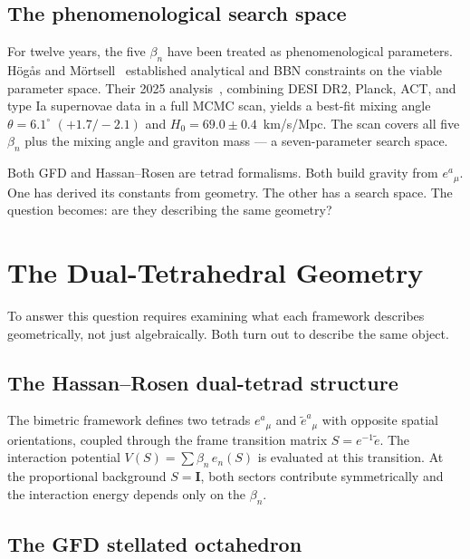 \documentclass[twocolumn,showpacs,preprintnumbers,amsmath,amssymb,prd]{revtex4-2}
\begin{document}
\subsection{The phenomenological search space}

For twelve years, the five $\beta_n$ have been treated as phenomenological parameters. H\"og\aa s and M\"ortsell~\cite{HogasMortsell2021a,HogasMortsell2021c} established analytical and BBN constraints on the viable parameter space. Their 2025 analysis~\cite{HogasMortsell2025}, combining DESI DR2, Planck, ACT, and type Ia supernovae data in a full MCMC scan, yields a best-fit mixing angle $\theta = 6.1^\circ$ $(+1.7/-2.1)$ and $H_0 = 69.0 \pm 0.4$~km/s/Mpc. The scan covers all five $\beta_n$ plus the mixing angle and graviton mass --- a seven-parameter search space.

Both GFD and Hassan--Rosen are tetrad formalisms. Both build gravity from $e^a{}_\mu$. One has derived its constants from geometry. The other has a search space. The question becomes: are they describing the same geometry?


\section{The Dual-Tetrahedral Geometry}
\label{sec:geometry}

To answer this question requires examining what each framework describes geometrically, not just algebraically. Both turn out to describe the same object.

\subsection{The Hassan--Rosen dual-tetrad structure}

The bimetric framework defines two tetrads $e^a{}_\mu$ and $\tilde{e}^a{}_\mu$ with opposite spatial orientations, coupled through the frame transition matrix $S = e^{-1}\tilde{e}$. The interaction potential $V(S) = \sum \beta_n\, e_n(S)$ is evaluated at this transition. At the proportional background $S = \mathbf{I}$, both sectors contribute symmetrically and the interaction energy depends only on the $\beta_n$.

\subsection{The GFD stellated octahedron}
\end{document}
